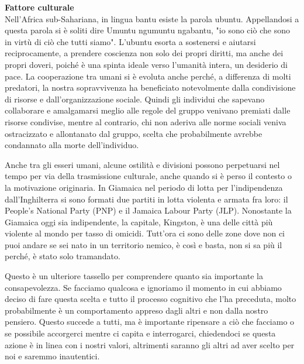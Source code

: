 \documentclass[12pt]{book} %
\begin{document}
\bigskip

\noindent \textbf{\large Fattore culturale} \\
Nell'Africa sub-Sahariana, in lingua bantu esiste la parola ubuntu. Appellandosi a questa parola si è soliti dire Umuntu
ngumuntu ngabantu, "io sono ciò che sono in virtù di ciò che tutti siamo". L'ubuntu esorta
a sostenersi e aiutarsi reciprocamente, a prendere coscienza non solo dei propri diritti, ma anche dei propri doveri,
poiché è una spinta ideale verso l'umanità intera, un desiderio di
pace. La cooperazione tra umani si è evoluta anche perché, a differenza di molti predatori, la nostra sopravvivenza ha beneficiato notevolmente dalla condivisione di risorse e dall’organizzazione sociale. 
Quindi gli individui che sapevano collaborare e amalgamarsi meglio alle regole
del gruppo venivano premiati dalle risorse condivise, mentre al contrario, chi non aderiva alle norme sociali veniva
ostracizzato e allontanato dal gruppo, scelta che probabilmente avrebbe condannato alla morte
dell'individuo. 

Anche tra gli esseri umani, alcune ostilità e divisioni possono perpetuarsi nel tempo per via della trasmissione culturale, anche quando si è perso il contesto o la motivazione originaria. In Giamaica nel periodo di lotta per
l'indipendenza dall'Inghilterra si sono formati due partiti in lotta violenta
e armata fra loro: il People's National Party (PNP) e il Jamaica Labour Party (JLP). Nonostante la Giamaica oggi sia
indipendente, la capitale, Kingston, è una delle città più violente al mondo per tasso di omicidi.
Tutt'ora ci sono delle zone dove non ci puoi andare se sei nato in un territorio nemico, è così e
basta, non si sa più il perché, è stato solo tramandato.

Questo è un ulteriore tassello per comprendere quanto sia importante la consapevolezza. Se facciamo qualcosa e ignoriamo
il momento in cui abbiamo deciso di fare questa scelta e tutto il processo cognitivo che l'ha
preceduta, molto probabilmente è un comportamento appreso dagli altri e non dalla nostro pensiero. Questo succede a
tutti, ma è importante ripensare a ciò che facciamo o se possibile accorgerci mentre ci capita e interrogarci,
chiedendoci se questa azione è in linea con i nostri valori, altrimenti saranno gli altri ad aver scelto per noi e
saremmo inautentici.
\end{document}
